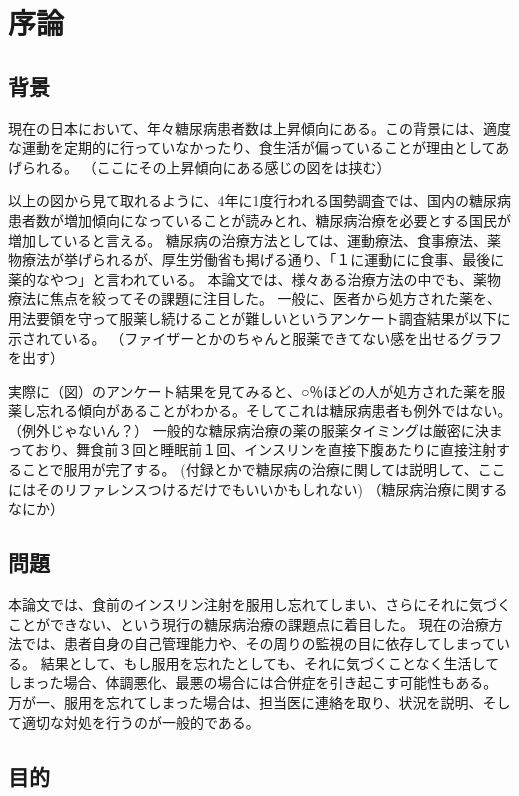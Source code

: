 \chapter{序論}
\label{chap:introduction}

\section{背景}
\label{section:background}
現在の日本において、年々糖尿病患者数は上昇傾向にある。この背景には、適度な運動を定期的に行っていなかったり、食生活が偏っていることが理由としてあげられる。
（ここにその上昇傾向にある感じの図をは挟む）

以上の図から見て取れるように、4年に1度行われる国勢調査では、国内の糖尿病患者数が増加傾向になっていることが読みとれ、糖尿病治療を必要とする国民が増加していると言える。
糖尿病の治療方法としては、運動療法、食事療法、薬物療法が挙げられるが、厚生労働省も掲げる通り、「１に運動にに食事、最後に薬的なやつ」と言われている。
本論文では、様々ある治療方法の中でも、薬物療法に焦点を絞ってその課題に注目した。
一般に、医者から処方された薬を、用法要領を守って服薬し続けることが難しいというアンケート調査結果が以下に示されている。
（ファイザーとかのちゃんと服薬できてない感を出せるグラフを出す）

実際に（図）のアンケート結果を見てみると、○％ほどの人が処方された薬を服薬し忘れる傾向があることがわかる。そしてこれは糖尿病患者も例外ではない。（例外じゃないん？）
一般的な糖尿病治療の薬の服薬タイミングは厳密に決まっており、舞食前３回と睡眠前１回、インスリンを直接下腹あたりに直接注射することで服用が完了する。
(付録とかで糖尿病の治療に関しては説明して、ここにはそのリファレンスつけるだけでもいいかもしれない)
（糖尿病治療に関するなにか）

\section{問題}
\label{section:problem}

本論文では、食前のインスリン注射を服用し忘れてしまい、さらにそれに気づくことができない、という現行の糖尿病治療の課題点に着目した。
現在の治療方法では、患者自身の自己管理能力や、その周りの監視の目に依存してしまっている。
結果として、もし服用を忘れたとしても、それに気づくことなく生活してしまった場合、体調悪化、最悪の場合には合併症を引き起こす可能性もある。
万が一、服用を忘れてしまった場合は、担当医に連絡を取り、状況を説明、そして適切な対処を行うのが一般的である。

\section{目的}
\label{section:purpose}

